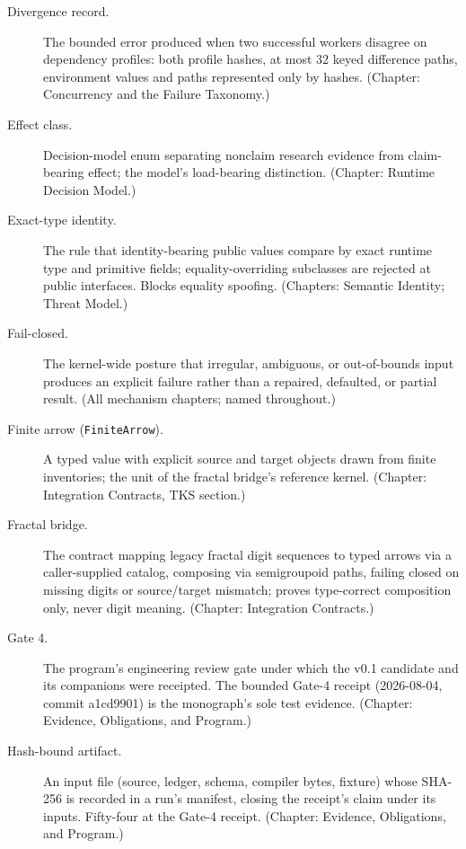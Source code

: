 \begin{description}
\item[Divergence record.] The bounded error produced when two successful workers disagree on dependency profiles: both profile hashes, at most 32 keyed difference paths, environment values and paths represented only by hashes. (Chapter: Concurrency and the Failure Taxonomy.)

\item[Effect class.] Decision-model enum separating nonclaim research evidence from claim-bearing effect; the model's load-bearing distinction. (Chapter: Runtime Decision Model.)

\item[Exact-type identity.] The rule that identity-bearing public values compare by exact runtime type and primitive fields; equality-overriding subclasses are rejected at public interfaces. Blocks equality spoofing. (Chapters: Semantic Identity; Threat Model.)

\item[Fail-closed.] The kernel-wide posture that irregular, ambiguous, or out-of-bounds input produces an explicit failure rather than a repaired, defaulted, or partial result. (All mechanism chapters; named throughout.)

\item[Finite arrow (\texttt{FiniteArrow}).] A typed value with explicit source and target objects drawn from finite inventories; the unit of the fractal bridge's reference kernel. (Chapter: Integration Contracts, TKS section.)

\item[Fractal bridge.] The contract mapping legacy fractal digit sequences to typed arrows via a caller-supplied catalog, composing via semigroupoid paths, failing closed on missing digits or source/target mismatch; proves type-correct composition only, never digit meaning. (Chapter: Integration Contracts.)

\item[Gate 4.] The program's engineering review gate under which the v0.1 candidate and its companions were receipted. The bounded Gate-4 receipt (2026-08-04, commit a1cd9901) is the monograph's sole test evidence. (Chapter: Evidence, Obligations, and Program.)

\item[Hash-bound artifact.] An input file (source, ledger, schema, compiler bytes, fixture) whose SHA-256 is recorded in a run's manifest, closing the receipt's claim under its inputs. Fifty-four at the Gate-4 receipt. (Chapter: Evidence, Obligations, and Program.)


\end{description}
